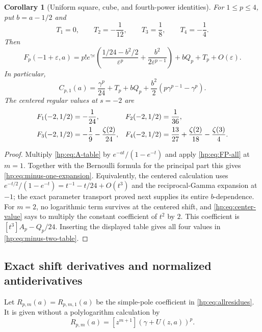 \documentclass[11pt,a4paper]{article}
\numberwithin{equation}{section}
\newtheorem{corollary}[theorem]{Corollary}
\theoremstyle{definition}
\theoremstyle{remark}
\begin{document}
\begin{corollary}[Uniform square, cube, and fourth-power identities]
\label{hp:cor:minus-one}
For $1\le p\le4$, put $b=a-1/2$ and
\[
 T_1=0,\qquad T_2=-\frac1{12},\qquad
 T_3=\frac18,\qquad T_4=-\frac14.
\]
Then
\begin{equation}\label{hp:eq:minus-one-expansion}
 \boxed{\quad
 F_p(-1+\varepsilon,a)=p!e^{\gamma\varepsilon}
 \left(\frac{1/24-b^2/2}{\varepsilon^p}
               +\frac{b^2}{2\varepsilon^{p-1}}\right)
                  +bQ_p+T_p+O(\varepsilon).\quad}
\end{equation}
In particular,
\begin{equation}\label{hp:eq:minus-one-FP}
 C_{p,1}(a)=\frac{\gamma^p}{24}+T_p+bQ_p
                 +\frac{b^2}{2}(p\gamma^{p-1}-\gamma^p).
\end{equation}
The centered regular values at $s=-2$ are
\begin{align}\label{hp:eq:minus-two-table}
 F_1(-2,1/2)&=-\frac1{24},&
 F_2(-2,1/2)&=\frac1{36},\notag\\
 F_3(-2,1/2)&=-\frac19-\frac{\zeta(2)}{24},&
 F_4(-2,1/2)&=\frac{13}{27}+\frac{\zeta(2)}{18}
                                  -\frac{\zeta(3)}4.
\end{align}
\end{corollary}

\begin{proof}
Multiply \eqref{hp:eq:A-table} by
$e^{-at}/(1-e^{-t})$ and apply \eqref{hp:eq:FP-all} at $m=1$.
Together with the Bernoulli formula for the principal part this gives
\eqref{hp:eq:minus-one-expansion}. Equivalently, the centered calculation
uses $e^{-t/2}/(1-e^{-t})=t^{-1}-t/24+O(t^3)$ and the
reciprocal-Gamma expansion at $-1$; the exact parameter transport
proved next supplies its entire $b$-dependence.
For $m=2$, no logarithmic term survives at the centered shift, and
\eqref{hp:eq:center-value} says to multiply the constant coefficient
of $t^2$ by $2$. This coefficient is
$[t^3]A_p-Q_p/24$. Inserting the displayed table gives all four
values in \eqref{hp:eq:minus-two-table}.
\end{proof}

\subsection{Exact shift derivatives and normalized antiderivatives}

Let $R_{p,m}(a)=R_{p,m,1}(a)$ be the simple-pole coefficient in
\eqref{hp:eq:allresidues}. It is given without a polylogarithm
calculation by
\begin{equation}\label{hp:eq:residue-poly}
 R_{p,m}(a)=[z^{m+1}](\gamma+U(z,a))^p.
\end{equation}
\end{document}
